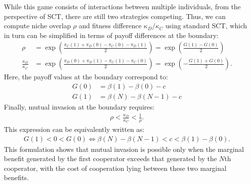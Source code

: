 \documentclass[12pt]{article}
\begin{document}
While this game consists of interactions between multiple individuals, from the perspective of SCT, there are still two strategies competing.
Thus, we can compute niche overlap $\rho$ and fitness difference $\kappa_D/\kappa_C$ using standard SCT, which in turn can be simplified in terms of payoff differences at the boundary:
\begin{align}
\rho &= \exp\left(\frac{\pi_C(1)+\pi_D(0)-\pi_C(0)-\pi_D(1)}{2}\right) = \exp\left(\frac{G(1)-G(0)}{2}\right)\\
\frac{\kappa_D}{\kappa_C} &= \exp\left(\frac{\pi_D(0)+\pi_D(1)-\pi_C(1)-\pi_C(0)}{2}\right) = \exp\left(-\frac{G(1)+G(0)}{2}\right).
\end{align}
Here, the payoff values at the boundary correspond to: 
\begin{align}
G(0) &= \beta(1) - \beta(0) -c\\
G(1) &= \beta(N) - \beta(N-1) - c
\end{align}
Finally, mutual invasion at the boundary requires:
\begin{align}
\rho < \frac{\kappa_D}{\kappa_C} < \frac{1}{\rho}.
\end{align}
This expression can be equivalently written as:
\begin{align}
G(1) < 0 < G(0) \iff \beta(N) - \beta(N-1) < c < \beta(1) - \beta(0).
\end{align}
This formulation shows that mutual invasion is possible only when the marginal benefit generated by the first cooperator exceeds that generated by the \(N\)th cooperator, with the cost of cooperation lying between these two marginal benefits.
\end{document}

